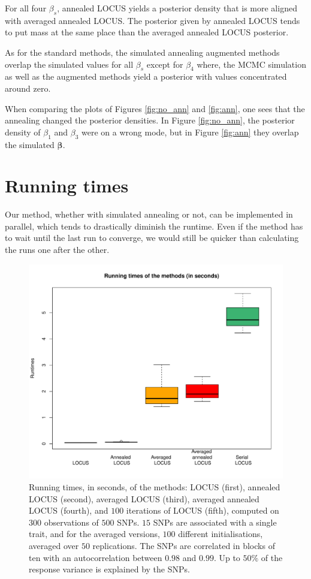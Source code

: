 \documentclass[a4paper, 11pt]{report}
\numberwithin{equation}{chapter}
\begin{document}
For all four $\beta_s$, annealed LOCUS yields a posterior density that is more aligned with averaged annealed LOCUS. The posterior given by annealed LOCUS tends to put mass at the same place than the averaged annealed LOCUS posterior.

As for the standard methods, the simulated annealing augmented methods overlap the simulated values for all $\beta_s$ except for $\beta_4$ where, the MCMC simulation as well as the augmented methods yield a posterior with values concentrated around zero.

When comparing the plots of Figures \ref{fig:no_ann} and \ref{fig:ann}, one sees that the annealing changed the posterior densities. In Figure \ref{fig:no_ann}, the posterior density of $\beta_1$ and $\beta_3$ were on a wrong mode, but in Figure \ref{fig:ann} they overlap the simulated $\boldsymbol{\beta}$. 

\section{Running times}

Our method, whether with simulated annealing or not, can be implemented in parallel, which tends to drastically diminish the runtime. Even if the method has to wait until the last run to converge, we would still be quicker than calculating the runs one after the other.

\begin{figure}[h]
\centering
\includegraphics[width=5in,bb= 0 0 600 540]{images/runtimes.pdf}
\caption{\label{fig:runtime} Running times, in seconds, of the methods: LOCUS (first), annealed LOCUS (second), averaged LOCUS (third), averaged annealed LOCUS (fourth), and $100$ iterations of LOCUS (fifth), computed on $300$ observations of $500$ SNPs. $15$ SNPs are associated with a single trait, and for the averaged versions, $100$ different initialisations, averaged over $50$ replications. The SNPs are correlated in blocks of ten with an autocorrelation between $0.98$ and $0.99$. Up to $50\%$ of the response variance is explained by the SNPs.}
\end{figure}
\end{document}
